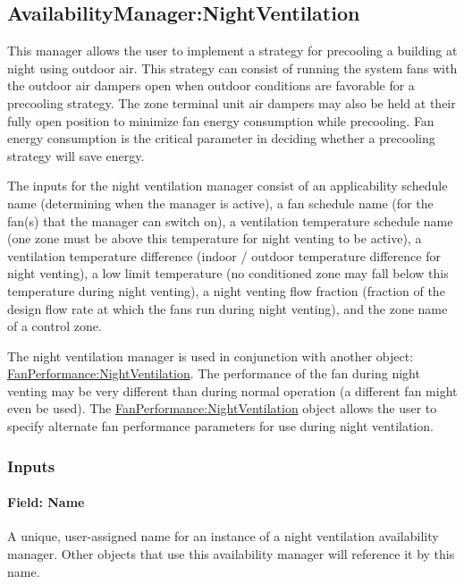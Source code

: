 \subsection{AvailabilityManager:NightVentilation}\label{availabilitymanagernightventilation}

This manager allows the user to implement a strategy for precooling a building at night using outdoor air. This strategy can consist of running the system fans with the outdoor air dampers open when outdoor conditions are favorable for a precooling strategy. The zone terminal unit air dampers may also be held at their fully open position to minimize fan energy consumption while precooling. Fan energy consumption is the critical parameter in deciding whether a precooling strategy will save energy.

The inputs for the night ventilation manager consist of an applicability schedule name (determining when the manager is active), a fan schedule name (for the fan(s) that the manager can switch on), a ventilation temperature schedule name (one zone must be above this temperature for night venting to be active), a ventilation temperature difference (indoor / outdoor temperature difference for night venting), a low limit temperature (no conditioned zone may fall below this temperature during night venting), a night venting flow fraction (fraction of the design flow rate at which the fans run during night venting), and the zone name of a control zone.

The night ventilation manager is used in conjunction with another object: \hyperref[fanperformancenightventilation]{FanPerformance:NightVentilation}. The performance of the fan during night venting may be very different than during normal operation (a different fan might even be used). The \hyperref[fanperformancenightventilation]{FanPerformance:NightVentilation} object allows the user to specify alternate fan performance parameters for use during night ventilation.

\subsubsection{Inputs}\label{inputs-9-023}

\paragraph{Field: Name}\label{field-name-8-021}

A unique, user-assigned name for an instance of a night ventilation availability manager. Other objects that use this availability manager will reference it by this name.

